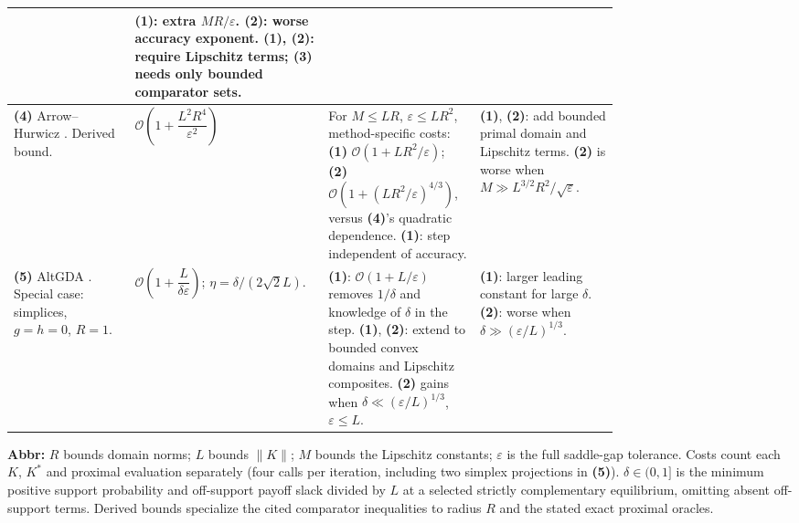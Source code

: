 \begin{table}[tp]
\begin{threeparttable}
\begin{tabularx}{\linewidth}{@{}>{\raggedright\arraybackslash}p{0.20\linewidth}>{\raggedright\arraybackslash}p{0.32\linewidth}>{\raggedright\arraybackslash}p{0.25\linewidth}>{\raggedright\arraybackslash}X@{}}
& \textbf{(1)}: extra $MR/\varepsilon$. \textbf{(2)}: worse accuracy exponent. \textbf{(1)}, \textbf{(2)}: require Lipschitz terms; \textbf{(3)} needs only bounded comparator sets. \\
\midrule
\textbf{(4)} Arrow--Hurwicz \citep[\S3.2, Eq.~(20)]{cp2010boundedcomparison}. Derived bound.
& $\mathcal{O}\!\left(1+\dfrac{L^2R^4}{\varepsilon^2}\right)$
& For $M\le LR$, $\varepsilon\le LR^2$, method-specific costs: \textbf{(1)} $\mathcal{O}(1+LR^2/\varepsilon)$; \textbf{(2)} $\mathcal{O}(1+(LR^2/\varepsilon)^{4/3})$, versus \textbf{(4)}'s quadratic dependence. \textbf{(1)}: step independent of accuracy.
& \textbf{(1)}, \textbf{(2)}: add bounded primal domain and Lipschitz terms. \textbf{(2)} is worse when $M\gg L^{3/2}R^2/\sqrt\varepsilon$. \\
\midrule
\textbf{(5)} AltGDA \citep[Thm.~1, v1]{nan2026matrixcomparison}. Special case: simplices, $g=h=0$, $R=1$.
& $\mathcal{O}\!\left(1+\dfrac{L}{\delta\varepsilon}\right)$; $\eta=\delta/(2\sqrt2 L)$.
& \textbf{(1)}: $\mathcal{O}(1+L/\varepsilon)$ removes $1/\delta$ and knowledge of $\delta$ in the step. \textbf{(1)}, \textbf{(2)}: extend to bounded convex domains and Lipschitz composites. \textbf{(2)} gains when $\delta\ll(\varepsilon/L)^{1/3}$, $\varepsilon\le L$.
& \textbf{(1)}: larger leading constant for large $\delta$. \textbf{(2)}: worse when $\delta\gg(\varepsilon/L)^{1/3}$. \\
\bottomrule
\end{tabularx}
\begin{tablenotes}[flushleft]\footnotesize
\item[] \textbf{Abbr:} $R$ bounds domain norms; $L$ bounds $\|K\|$; $M$ bounds the Lipschitz constants; $\varepsilon$ is the full saddle-gap tolerance. Costs count each $K$, $K^*$ and proximal evaluation separately (four calls per iteration, including two simplex projections in \textbf{(5)}). $\delta\in(0,1]$ is the minimum positive support probability and off-support payoff slack divided by $L$ at a selected strictly complementary equilibrium, omitting absent off-support terms. Derived bounds specialize the cited comparator inequalities to radius $R$ and the stated exact proximal oracles.
\end{tablenotes}
\end{threeparttable}
\end{table}
\clearpage
